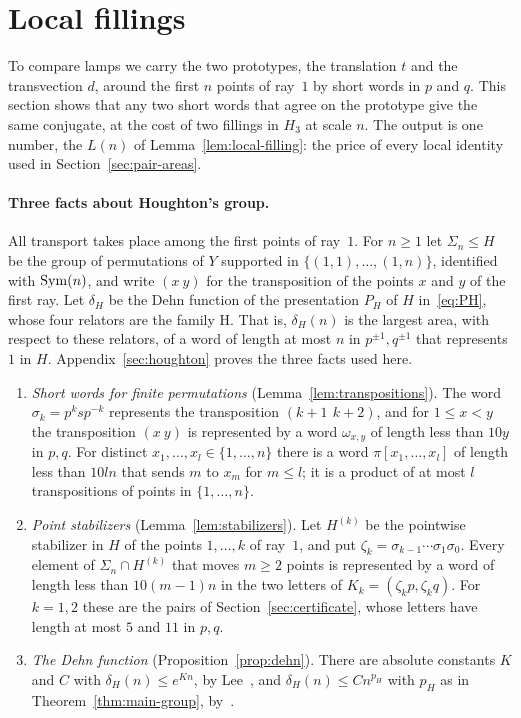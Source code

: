 \section{Local fillings}\label{sec:fillings}

To compare lamps we carry the two prototypes, the translation $t$ and the transvection $d$, around the first $n$ points of ray~$1$ by short
words in $p$ and $q$. This section shows that any two short words that agree on the prototype give the same conjugate, at the cost of two
fillings in $H_3$ at scale $n$. The output is one number, the $L(n)$ of Lemma~\ref{lem:local-filling}: the price of every local identity used
in Section~\ref{sec:pair-areas}.

\paragraph{Three facts about Houghton's group.} All transport takes place among the first points of ray~$1$. For $n\ge1$ let $\Sigma_n\le H$
be the group of permutations of $Y$ supported in $\{(1,1),\dots,(1,n)\}$, identified with $\operatorname{Sym}(n)$, and write $(x\ y)$ for the transposition of
the points $x$ and $y$ of the first ray. Let $\delta_H$ be the Dehn function of the presentation $P_H$ of $H$ in~\eqref{eq:PH}, whose four
relators are the family \textsf{H}. That is, $\delta_H(n)$ is the largest area, with respect to these relators, of a word of length at most $n$
in $p^{\pm1},q^{\pm1}$ that represents $1$ in $H$. Appendix~\ref{sec:houghton} proves the three facts used here.
\begin{enumerate}[label=(H\arabic*),itemsep=1pt,leftmargin=*]
\item \emph{Short words for finite permutations} (Lemma~\ref{lem:transpositions}). The word $\sigma_k=p^ksp^{-k}$ represents the transposition
$(k{+}1\ \,k{+}2)$, and for $1\le x<y$ the transposition $(x\ y)$ is represented by a word $\omega_{x,y}$ of length less than $10y$ in $p,q$. For
distinct $x_1,\dots,x_l\in\{1,\dots,n\}$ there is a word $\pi[x_1,\dots,x_l]$ of length less than $10ln$ that sends $m$ to $x_m$ for $m\le l$; it
is a product of at most $l$ transpositions of points in $\{1,\dots,n\}$.
\item \emph{Point stabilizers} (Lemma~\ref{lem:stabilizers}). Let $H^{(k)}$ be the pointwise stabilizer in $H$ of the points $1,\dots,k$ of
ray~$1$, and put $\zeta_k=\sigma_{k-1}\cdots\sigma_1\sigma_0$. Every element of $\Sigma_n\cap H^{(k)}$ that moves $m\ge2$ points is represented
by a word of length less than $10(m-1)n$ in the two letters of $K_k=(\zeta_kp,\zeta_kq)$. For $k=1,2$ these are the pairs of
Section~\ref{sec:certificate}, whose letters have length at most $5$ and $11$ in $p,q$.
\item \emph{The Dehn function} (Proposition~\ref{prop:dehn}). There are absolute constants $K$ and $C$ with $\delta_H(n)\le e^{Kn}$, by
Lee~\cite[Theorem~D]{Lee2012}, and $\delta_H(n)\le Cn^{p_H}$ with $p_H$ as in Theorem~\ref{thm:main-group},
by~\cite[Theorems~3.2 and~3.3]{DouglasMghirbiA}.
\end{enumerate}

